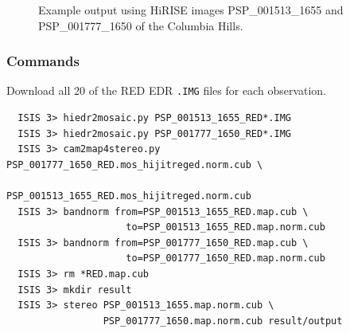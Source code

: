 \begin{figure}[h!]
\centering
  \hfil
\caption{Example output using HiRISE images PSP\_001513\_1655 and
  PSP\_001777\_1650 of the Columbia Hills.}
\label{fig:hirise_chills_example}
\end{figure}

\subsubsection*{Commands}

Download all 20 of the RED EDR \texttt{.IMG} files for each observation.
\begin{verbatim}
  ISIS 3> hiedr2mosaic.py PSP_001513_1655_RED*.IMG
  ISIS 3> hiedr2mosaic.py PSP_001777_1650_RED*.IMG
  ISIS 3> cam2map4stereo.py PSP_001777_1650_RED.mos_hijitreged.norm.cub \
                            PSP_001513_1655_RED.mos_hijitreged.norm.cub
  ISIS 3> bandnorm from=PSP_001513_1655_RED.map.cub \
                     to=PSP_001513_1655_RED.map.norm.cub
  ISIS 3> bandnorm from=PSP_001777_1650_RED.map.cub \
                     to=PSP_001777_1650_RED.map.norm.cub
  ISIS 3> rm *RED.map.cub
  ISIS 3> mkdir result
  ISIS 3> stereo PSP_001513_1655.map.norm.cub \
                 PSP_001777_1650.map.norm.cub result/output
\end{verbatim}

